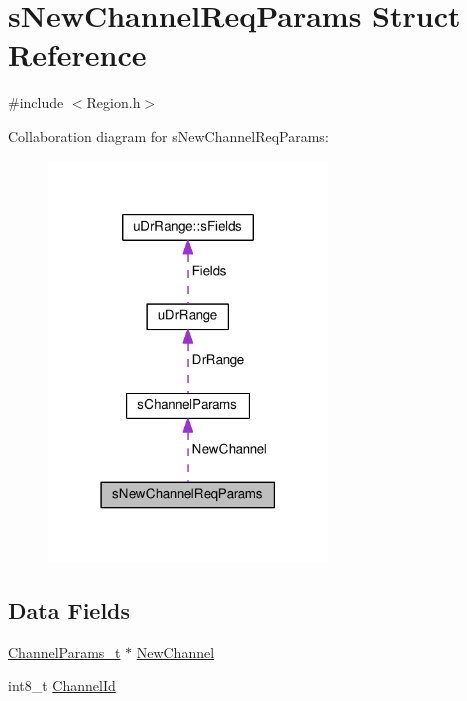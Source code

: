 \hypertarget{structsNewChannelReqParams}{}\section{s\+New\+Channel\+Req\+Params Struct Reference}
\label{structsNewChannelReqParams}


{\ttfamily \#include $<$Region.\+h$>$}



Collaboration diagram for s\+New\+Channel\+Req\+Params\+:
\nopagebreak
\begin{figure}[H]
\begin{center}
\leavevmode
\includegraphics[width=210pt]{structsNewChannelReqParams__coll__graph}
\end{center}
\end{figure}
\subsection*{Data Fields}
\begin{DoxyCompactItemize}
\item 
\hyperlink{group__LORAMAC_ga1360ca6f82c6d125ea43a9dad9b56184}{Channel\+Params\+\_\+t} $\ast$ \hyperlink{structsNewChannelReqParams_a62267cdad01a56a941b8a9a82be81708}{New\+Channel}
\item 
int8\+\_\+t \hyperlink{structsNewChannelReqParams_a1bd8e73e08662496888e9102d81b5262}{Channel\+Id}
\end{DoxyCompactItemize}


